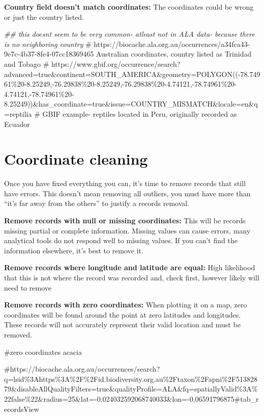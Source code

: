 \documentclass[
  letterpaper,
  DIV=11,
  numbers=noendperiod,
  oneside]{scrreprt}
\newenvironment{Shaded}{\begin{snugshade}}{\end{snugshade}}
\newcommand{\CommentTok}[1]{\textcolor[rgb]{0.37,0.37,0.37}{#1}}
\newcommand{\DocumentationTok}[1]{\textcolor[rgb]{0.37,0.37,0.37}{\textit{#1}}}
\begin{document}
\textbf{Country field doesn't match coordinates:} The coordinates could
be wrong or just the country listed.

\begin{Shaded}
\begin{Highlighting}[]
\DocumentationTok{\#\# this doesnt seem to be very common{-} atleast not in ALA data{-} because there is no neighboring country}
\CommentTok{\# https://biocache.ala.org.au/occurrences/a34fca43{-}9e7c{-}4b37{-}8fe4{-}07cc18369465 Australian coordinates, country listed as Trinidad and Tobago}
\CommentTok{\# https://www.gbif.org/occurrence/search?advanced=true\&continent=SOUTH\_AMERICA\&geometry=POLYGON(({-}78.74961\%20{-}8.25249,{-}76.29838\%20{-}8.25249,{-}76.29838\%20{-}4.74121,{-}78.74961\%20{-}4.74121,{-}78.74961\%20{-}8.25249))\&has\_coordinate=true\&issue=COUNTRY\_MISMATCH\&locale=en\&q=reptilia   \# GBIF example{-} reptiles located in Peru, originally recorded as Ecuador}
\end{Highlighting}
\end{Shaded}

\hypertarget{coordinate-cleaning}{%
\section{Coordinate cleaning}\label{coordinate-cleaning}}

Once you have fixed everything you can, it's time to remove records that
still have errors. This doesn't mean removing all outliers, you must
have more than ``it's far away from the others'' to justify a records
removal.

\textbf{Remove records with null or missing coordinates:} This will be
records missing partial or complete information. Missing values can
cause errors, many analytical tools do not respond well to missing
values. If you can't find the information elsewhere, it's best to remove
it.

\textbf{Remove records where longitude and latitude are equal:} High
likelihood that this is not where the record was recorded and, check
first, however likely will need to remove

\textbf{Remove records with zero coordinates:} When plotting it on a
map, zero coordinates will be found around the point at zero latitudes
and longitudes. These records will not accurately represent their valid
location and must be removed.

\begin{Shaded}
\begin{Highlighting}[]
\CommentTok{\#zero coordinates acacia }

\CommentTok{\#https://biocache.ala.org.au/occurrences/search?q=lsid\%3Ahttps\%3A\%2F\%2Fid.biodiversity.org.au\%2Ftaxon\%2Fapni\%2F51382879\&disableAllQualityFilters=true\&qualityProfile=ALA\&fq=spatiallyValid\%3A\%22false\%22\&radius=25\&lat={-}0.024032592068740033\&lon={-}0.06591796875\#tab\_recordsView }
\end{Highlighting}
\end{Shaded}
\end{document}

